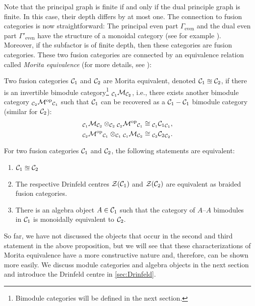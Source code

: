 Note that the principal graph is finite if and only if the dual principle graph is finite. In this case, their depth differs by at most one. The connection to fusion categories is now straightforward: The principal even part $\Gamma_\mathrm{even}$ and the dual even part $\Gamma'_\mathrm{even}$ have the structure of a monoidal category (see for example \cite{grossman_quantum_2012}). Moreover, if the subfactor is of finite depth, then these categories are fusion categories. These two fusion categories are connected by an equivalence relation called \emph{Morita equivalence} (for more details, see \cite{Nikshych2013,Etingof2005}):
	\begin{defn}
		Two fusion categories ${\mathcal{C}}_1$ and ${\mathcal{C}}_2$ are Morita equivalent, denoted ${\mathcal{C}}_1\approxeq{\mathcal{C}}_2$, if there is an invertible bimodule category\footnote{Bimodule categories will be defined in the next section.} ${}_{{\mathcal{C}}_1}\mathcal{M}_{{\mathcal{C}}_2}$, i.e., there exists another bimodule category ${}_{{\mathcal{C}}_2}{\mathcal{M}^\mathrm{op}}_{{\mathcal{C}}_1}$ such that ${\mathcal{C}}_1$ can be recovered as a ${\mathcal{C}}_1-{\mathcal{C}}_1$ bimodule category  (similar for ${\mathcal{C}}_2$):
			\begin{align}
				{}_{{\mathcal{C}}_1}\mathcal{M}_{{\mathcal{C}}_2}\otimes_{{\mathcal{C}}_2}{}_{{\mathcal{C}}_2}{\mathcal{M}^\mathrm{op}}_{{\mathcal{C}}_1}&\cong{}_{{\mathcal{C}}_1}{{\mathcal{C}}_1}_{{\mathcal{C}}_1},\\
				{}_{{\mathcal{C}}_2}{\mathcal{M}^\mathrm{op}}_{{\mathcal{C}}_1}\otimes_{{\mathcal{C}}_1}{}_{{\mathcal{C}}_1}\mathcal{M}_{{\mathcal{C}}_2}&\cong{}_{{\mathcal{C}}_2}{{\mathcal{C}}_2}_{{\mathcal{C}}_2}.
			\end{align}
	\end{defn}

\begin{prop}
	\label{prop:Morita}
	For two fusion categories ${\mathcal{C}}_1$ and ${\mathcal{C}}_2$, the following statements are equivalent:	
		\begin{enumerate}
			\item ${\mathcal{C}}_1\approxeq{\mathcal{C}}_2$
			\item The respective Drinfeld centres $\mathcal{Z}({\mathcal{C}}_1)$ and $\mathcal{Z}({\mathcal{C}}_2)$ are equivalent as braided fusion categories.
			\item There is an algebra object $A\in{\mathcal{C}}_1$ such that the category of $A$--$A$ bimodules in ${\mathcal{C}}_1$ is monoidally equivalent to ${\mathcal{C}}_2$.
		\end{enumerate}
\end{prop}

So far, we have not discussed the objects that occur in the second and third statement in the above proposition, but we will see that these characterizations of Morita equivalence have a more constructive nature and, therefore, can be shown more easily. We discuss module categories and algebra objects in the next section and introduce the Drinfeld centre in \cref{sec:Drinfeld}.


